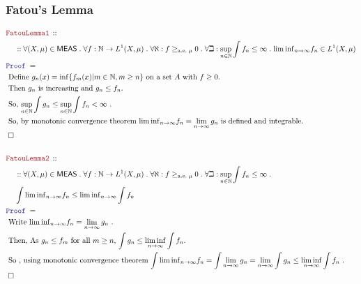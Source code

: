 \documentclass[12pt]{scrartcl}
\newcommand{\LOGIC}[1]{\textcolor{Blue}{\mathtt{#1}}}
\newcommand{\THM}[1]{\textcolor{Maroon}{\mathtt{#1}}}
\renewcommand{\.}{\; . \;}
\newcommand{\Theorem}[2]{& \THM{#1} \, :: \, #2 \\ & \Proof = \\ }
\newcommand{\NewLine}{\\ & \kern 1pc}
\newcommand{\Page}[1]{ \begin{align*} #1 \end{align*}   }
\newcommand{\Nat}{\mathbb{N} }
\newcommand{\QED}{\; \square}
\newcommand{\EndProof}{& \QED \\}
\newcommand{\Proof}{\LOGIC{Proof} \; }
\newcommand{\Explain}[1]{& \text{#1.} \\}
\renewcommand{\ae}{\mathrm{a.e.}}
\newcommand{\MEAS}{\mathsf{MEAS}}
\begin{document}
\subsubsection{Fatou's Lemma}
\Page{
	\Theorem{FatouLemma1}
	{
		\NewLine ::		 
		 \forall (X,\mu) \in \MEAS \.
		 \forall f : \Nat \to  L^1(X,\mu) \.
		 \forall \aleph : f \ge_{\ae\;\mu} 0 \.
		 \forall \beth : \sup_{n \in \Nat} \int f_n \le \infty \.  
		 {\lim\inf}_{n \to \infty} f_n \in L^1(X,\mu)
	}
	\Explain{
		Define $g_n(x) = \inf\{  f_m(x) | m \in \Nat, m \ge n  \}$ on a set $A$ with $f \ge 0$}
	\Explain{
		Then $g_n$ is increasing and $g_n \le f_n$}
	\Explain{
		So, $\sup_{n\in \Nat}\int g_n \le \sup_{n \in \Nat} \int f_n < \infty$	
	}
	\Explain{
		So, by monotonic convergence theorem 
		$ {\lim\inf}_{n \to \infty} f_n  =\lim_{n \to \infty} g_n$ is defined and integrable}
	\EndProof
	\\
	\Theorem{FatouLemma2}
	{
		 \NewLine ::		 
		 \forall (X,\mu) \in \MEAS \.
		 \forall f : \Nat \to  L^1(X,\mu) \.
		 \forall \aleph : f \ge_{\ae\;\mu} 0 \.
		 \forall \beth : \sup_{n \in \Nat} \int f_n \le \infty \.   \NewLine
		 \int {\lim\inf}_{n \to \infty} f_n \le {\lim \inf}_{n \to \infty}  \int f_n
	}
	\Explain{
		Write $ {\lim\inf}_{n \to \infty} f_n  =\lim_{n \to \infty} g_n$
	}
	\Explain{
		Then, As $g_n \le f_m$ for all $m \ge n$, 
		$
			\int g_n \le \liminf_{n \to \infty} \int f_n
		$}
	\Explain{
		So	, using monotonic convergence theorem
		$
			\int {\lim\inf}_{n \to \infty} f_n =
			\int \lim_{n \to \infty} g_n  =
			\lim_{n \to \infty}  \int g_n \le 
			\liminf_{n \to \infty} \int f_n
		$
	}
	\EndProof
}
\newpage
\end{document}

